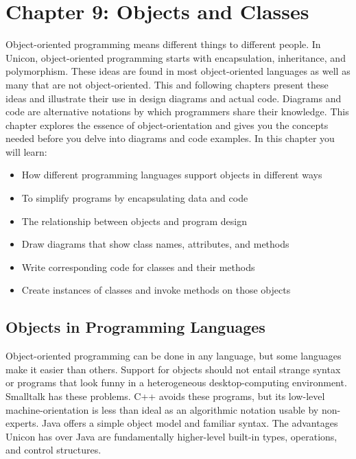 \clearpage\section{Chapter 9: Objects and Classes}

Object-oriented programming means
different things to different people. In Unicon, object-oriented
programming starts with encapsulation, inheritance, and polymorphism.
These ideas are found in most object-oriented languages as well as many
that are not object-oriented. This and following chapters
present these ideas and illustrate their use in design diagrams and
actual code. Diagrams and code are
alternative notations by which programmers share their knowledge. This
chapter explores the essence of object-orientation and gives you the
concepts needed before you delve into diagrams and code examples. In
this chapter you will learn:

\begin{itemize}\itemsep0pt
\item How different programming languages support objects in different
ways
\item To simplify programs by encapsulating data and code
\item The relationship between objects and program design
\item Draw diagrams that show class names, attributes, and methods
\item Write corresponding code for classes and their methods
\item Create instances of classes and invoke methods on those objects
\end{itemize}

\subsection{Objects in Programming Languages}

Object-oriented programming can be done in any language, but some
languages make it easier than others. Support for objects should not
entail strange syntax or programs that look funny in a
heterogeneous desktop-computing environment. Smalltalk
has these problems. C++ avoids these programs, but its low-level
machine-orientation is less than ideal as an algorithmic
notation usable by non-experts. Java offers a simple object
model and familiar syntax. The advantages
Unicon has over Java are fundamentally higher-level built-in types,
operations, and control structures.

